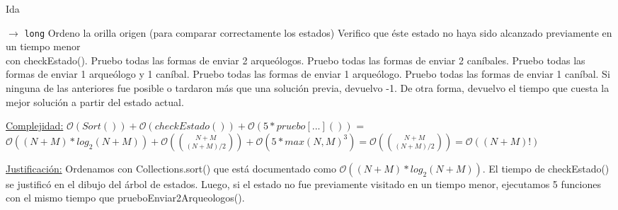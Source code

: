 \begin{algorithm}[H]
\caption{Ida}
\begin{algorithmic}[1]
   $\to $ \texttt{long}
  \State Ordeno la orilla origen (para comparar correctamente los estados)
  \State Verifico que éste estado no haya sido alcanzado previamente en un tiempo menor \\ con checkEstado().
  \State 
  \State Pruebo todas las formas de enviar 2 arqueólogos.
  \State Pruebo todas las formas de enviar 2 caníbales.
  \State Pruebo todas las formas de enviar 1 arqueólogo y 1 caníbal.
  \State Pruebo todas las formas de enviar 1 arqueólogo.
  \State Pruebo todas las formas de enviar 1 caníbal.
  \State 
  \State Si ninguna de las anteriores fue posible o tardaron más que una solución previa, devuelvo -1.
  \State De otra forma, devuelvo el tiempo que cuesta la mejor solución a partir del estado actual.
 \EndProcedure
\end{algorithmic}
\underline{Complejidad:} 
 $\mathcal{O}(Sort()) + \mathcal{O}(checkEstado()) + \mathcal{O}(5*pruebo[...]())$ = $\mathcal{O}((N+M)*log_2(N+M)) + \mathcal{O}(\binom{N+M}{(N+M)/2}) + \mathcal{O}(5*max(N,M)^3) = \mathcal{O}(\binom{N+M}{(N+M)/2}) = \mathcal{O}((N+M)!)$
 
 \vspace*{5mm}
 \underline{Justificación:}
 Ordenamos con Collections.sort() que está documentado como $\mathcal{O}((N+M)*log_2(N+M))$. El tiempo de checkEstado() se justificó en el dibujo del árbol de estados. Luego, si el estado no fue previamente visitado en un tiempo menor, ejecutamos 5 funciones con el mismo tiempo que prueboEnviar2Arqueologos().
 
\end{algorithm}

